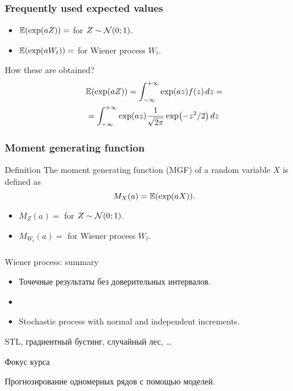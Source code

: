 \begin{frame}
  \frametitle{Frequently used expected values}

  \begin{itemize}
    \item $\mathbb{E}(\exp(aZ)) = $ for $Z \sim \mathcal{N}(0;1)$.
    \item $\mathbb{E}(\exp(aW_t)) = $ for Wiener process $W_t$.
  \end{itemize}
  
  \begin{block}{How these are obtained?}
    \begin{align*}
      &\mathbb{E}(\exp(aZ)) = \int_{-\infty}^{+\infty} \exp(az) f(z) \,dz = \\
      & = \int_{-\infty}^{+\infty} \exp(az) \frac{1}{\sqrt{2\pi}}\exp(-z^2/2) \,dz
    \end{align*}
  \end{block}

\end{frame}


\begin{frame}
  \frametitle{Moment generating function}

\begin{block}{Definition}
    The \alert{moment generating function} (MGF) of a random variable $X$ is defined as 
  \[
  M_X(a) = \mathbb{E}(\exp(a X)).
  \] 
\end{block}

\pause 

\begin{itemize}
  \item $M_Z(a) = $ for $Z \sim \mathcal{N}(0;1)$.
  \item $M_{W_t}(a)= $ for Wiener process $W_t$.
\end{itemize}
  
\end{frame}

\begin{frame}
    \frametitle{}
  
    
  
  \end{frame}

\begin{frame}{Wiener process: summary}

\begin{itemize}[<+->]
  \item Точечные результаты без доверительных интервалов. 
  \item 
  \item Stochastic process with \alert{normal} and \alert{independent increments}.
\end{itemize}
  
STL, градиентный бустинг, случайный лес, \ldots

\end{frame}

\begin{frame}{Фокус курса}

Прогнозирование одномерных рядов с помощью моделей. 

\end{frame}



